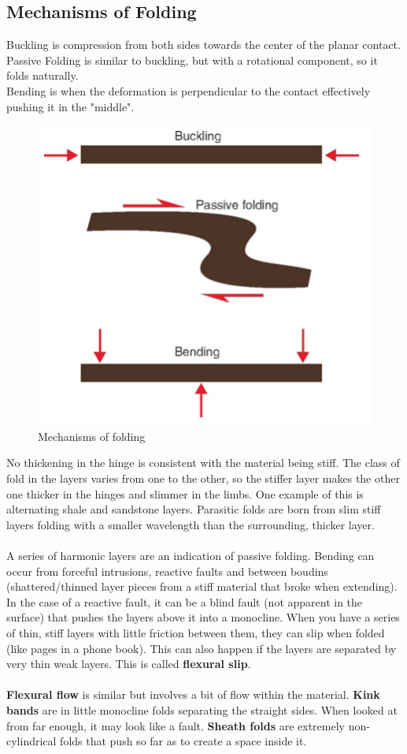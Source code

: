 \documentclass[12pt,a4paper]{report}
\begin{document}
\subsection*{Mechanisms of Folding}
Buckling is compression from both sides towards the center of the planar contact.\\
Passive Folding is similar to buckling, but with a rotational component, so it folds naturally.\\
Bending is when the deformation is perpendicular to the contact effectively pushing it in the "middle".\\
\begin{figure}[h]
  \includegraphics[scale=0.50]{mechanisms-of-folding.png}
  \centering
  \caption{Mechanisms of folding}
\end{figure}
No thickening in the hinge is consistent with the material being stiff.
The class of fold in the layers varies from one to the other, so the stiffer layer makes the other one thicker in the hinges and slimmer in the limbs.
One example of this is alternating shale and sandstone layers.
Parasitic folds are born from slim stiff layers folding with a smaller wavelength than the surrounding, thicker layer.\\
\\
A series of harmonic layers are an indication of passive folding.
Bending can occur from forceful intrusions, reactive faults and between boudins (shattered/thinned layer pieces from a stiff material that broke when extending). In the case of a reactive fault, it can be a blind fault (not apparent in the surface) that pushes the layers above it into a monocline.
When you have a series of thin, stiff layers with little friction between them, they can slip when folded (like pages in a phone book).
This can also happen if the layers are separated by very thin weak layers. This is called \textbf{flexural slip}.\\
\\
\textbf{Flexural flow} is similar but involves a bit of flow within the material.
\textbf{Kink bands} are in little monocline folds separating the straight sides.
When looked at from far enough, it may look like a fault.
\textbf{Sheath folds} are extremely non-cylindrical folds that push so far as to create a space inside it.
\end{document}
